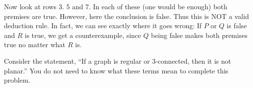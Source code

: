 \documentclass[10pt]{exam}
\begin{document}
\begin{questions}
\begin{solution}
\begin{parts}
	      Now look at rows 3. 5 and 7.  In each of these (one would be enough) both premises are true.  However, here the conclusion is false.  Thus this is NOT a valid deduction rule.  In fact, we can see exactly where it goes wrong: If $P$ or $Q$ is false and $R$ is true, we get a counterexample, since $Q$ being false makes both premises true no matter what $R$ is.
	  \end{parts}
	\end{solution}


	\question[9] Consider the statement, ``If a graph is regular or 3-connected, then it is not planar.''  You do not need to know what these terms mean to complete this problem.

\begin{solution}
\end{solution}
\end{questions}
\end{document}
